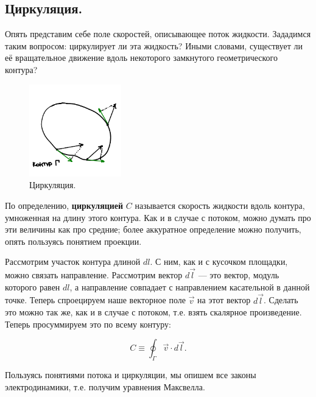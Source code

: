 \documentclass[11pt,a4paper]{article}
\numberwithin{equation}{section}
\begin{document}
\subsection{Циркуляция.}
\label{sec:curl}

Опять представим себе поле скоростей, описывающее поток
жидкости. Зададимся таким вопросом: циркулирует ли эта жидкость? Иными
словами, существует ли её вращательное движение вдоль некоторого
замкнутого геометрического контура? 

\begin{figure}
  \vspace{-1.5cm}
  \begin{center}
    \includegraphics[width=4cm,height=4cm]{curl.pdf}
  \end{center}
  \vspace{-0.7cm}
  \caption{Циркуляция.}
  \label{fig:curl}
\end{figure}


По определению, \textbf{циркуляцией} $C$ называется скорость жидкости вдоль
контура, умноженная на длину этого контура. Как и в случае с потоком,
можно думать про эти величины как про средние; более аккуратное
определение можно получить, опять пользуясь понятием проекции. 

Рассмотрим участок контура длиной $dl$. С ним, как и с кусочком
площадки, можно связать направление. Рассмотрим вектор $d\vec{l}$ ---
это вектор, модуль которого равен $dl$, а направление совпадает с
направлением касательной в данной точке. Теперь спроецируем наше
векторное поле $\vec{v}$ на этот вектор $d\vec{l}$. Сделать это можно
так же, как и в случае с потоком, т.е. взять скалярное
произведение. Теперь просуммируем это по всему контуру:

\begin{equation}
  \label{eq:curl}
  C \equiv \oint_\Gamma \vec{v} \cdot d \vec{l}.
\end{equation}

Пользуясь понятиями потока и циркуляции, мы опишем все законы
электродинамики, т.е. получим уравнения Максвелла. 
\end{document}
